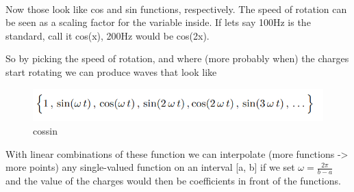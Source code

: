 \documentclass[11pt]{article}
\begin{document}
    \begin{center}
    \end{center}
    { \hspace*{\fill} \\}
    
    Now those look like cos and sin functions, respectively. The speed of
rotation can be seen as a scaling factor for the variable inside. If
lets say 100Hz is the standard, call it cos(x), 200Hz would be cos(2x).

So by picking the speed of rotation, and where (more probably when) the
charges start rotating we can produce waves that look like

    \begin{figure}
\centering
\includegraphics{pics/cossin.png}
\caption{cossin}
\end{figure}

    With linear combinations of these function we can interpolate (more
functions -\textgreater{} more points) any single-valued function on an
interval {[}a, b{]} if we set \(\omega=\frac{2\pi}{b-a}\) and the value
of the charges would then be coefficients in front of the functions.

    


    
    
    
\end{document}
